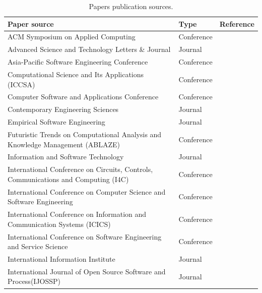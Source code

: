 \begin{table}[h!]
  \centering
  \caption{Papers publication sources.}
  \begin{tabular}{@{}llr@{}} 
    \toprule
    \textbf{Paper source} & \textbf{Type} & \textbf{Reference} \\ 
    \midrule
    ACM Symposium on Applied Computing                 & Conference     & \cite{Zhang:2015}\\ 
    \midrule
    Advanced Science and Technology Letters \& Journal & Journal         & \cite{Jin:2016a}\\
    \midrule
    Asia-Pacific Software Engineering Conference         & Conference     & \cite{Yang:2012}\\
    \midrule
    Computational Science and Its Applications (ICCSA)     & Conference     & \cite{Meera:2014}\\
    \midrule
    Computer Software and Applications Conference         & Conference     & \cite{Yang:2014b}\\
    \midrule
    Contemporary Engineering Sciences                     & Journal         & \cite{Jin:2016b}\\
    \midrule
    Empirical Software Engineering                     & Journal         & \cite{Tian:2016}\\
    \midrule
    Futuristic Trends on Computational Analysis and Knowledge Management (ABLAZE) & Conference & \cite{Gujral:2015}\\
    \midrule
    Information and Software Technology                 & Journal         & \cite{Xia:2015}\\
    \midrule
    International Conference on Circuits, Controls, Communications and Computing (I4C) & Conference & \cite{Pushpalathas:2016}\\
    \midrule
    International Conference on Computer Science and Software Engineering         & Conference & \cite{Sabor:2016}\\
    \midrule
    International Conference on Information and Communication Systems (ICICS)     & Conference & \cite{Otoom:2016}\\
    \midrule
    International Conference on Software Engineering and Service Science        & Conference & \cite{Yang:2014a}\\
    \midrule
    International Information Institute                                 & Journal         & \cite{Jin:2016c}\\
    \midrule
    International Journal of Open Source Software and Process(IJOSSP)    & Journal         & \cite{Chaturvedi:2012}\\

\end{tabular}
\end{table}
